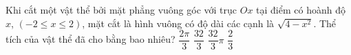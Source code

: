 \begin{ex}%
	Khi cắt một vật thể bởi mặt phẳng vuông góc với trục $Ox$ tại điểm có hoành độ $x$, $(-2 \leq x \leq 2)$, mặt cắt là hình vuông có độ dài các cạnh là $\sqrt{4 - x^2}$. Thể tích của vật thể đã cho bằng bao  nhiêu?
	 \choice
		 {$\dfrac{2\pi}{3}$}
		{\True $\dfrac{32}{3}$} 
		{$\dfrac{32}{3} \pi$} 
		{$\dfrac{2}{3}$} 
\end{ex}




